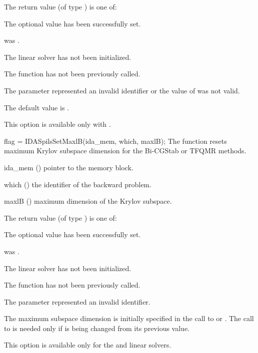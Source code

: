 {
  The return value  (of type ) is one of:
  \begin{args}
  \item[\Id{IDASPILS\_SUCCESS}] 
    The optional value has been successfully set.
  \item[\Id{IDASPILS\_MEM\_NULL}]
     was .
  \item[\Id{IDASPILS\_LMEM\_NULL}]
    The {\idaspils} linear solver has not been initialized.
  \item[\Id{IDASPILS\_NO\_ADJ}]
    The function  has not been previously called.
  \item[\Id{IDASPILS\_ILL\_INPUT}]
    The parameter  represented an invalid identifier or the 
    value of  was not valid.
  \end{args}
}
{
  The default value is .

  {\warn}This option is available only with {\idaspgmr}.
}
{
  flag = IDASpilsSetMaxlB(ida\_mem, which, maxlB);
}
{
  The function  resets maximum Krylov subspace
  dimension for the Bi-CGStab or TFQMR 
  methods.
}
{
  \begin{args}
  \item[ida\_mem] ()
    pointer to the {\idas} memory block.
  \item[which] ()
    the identifier of the backward problem.
  \item[maxlB] ()
    maximum dimension of the Krylov subspace.
  \end{args}
}
{
  The return value  (of type ) is one of:
  \begin{args}
  \item[\Id{IDASPILS\_SUCCESS}] 
    The optional value has been successfully set.
  \item[\Id{IDASPILS\_MEM\_NULL}]
     was .
  \item[\Id{IDASPILS\_LMEM\_NULL}]
    The {\idaspils} linear solver has not been initialized.
  \item[\Id{IDASPILS\_NO\_ADJ}]
    The function  has not been previously called.
  \item[\Id{IDASPILS\_ILL\_INPUT}]
    The parameter  represented an invalid identifier.
  \end{args}
}
{
  The maximum subspace dimension is initially specified in the call
  to  or .  The call to 
  is needed only if  is being changed from its previous value.

  {\warn}This option is available only for the {\idaspbcg} and {\idasptfqmr} linear solvers.
}
